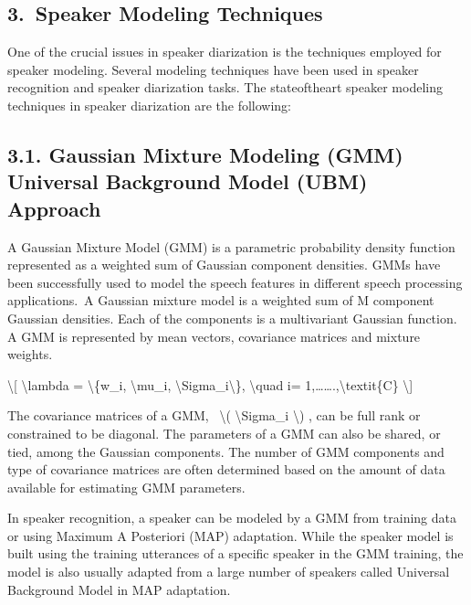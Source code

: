\documentclass[letterpaper,10pt,english]{jupyterBook}
\begin{document}
\subsection{3. Speaker Modeling Techniques}
\label{\detokenize{Recognition/Speaker_Recognition_and_Verification:speaker-modeling-techniques}}
\sphinxAtStartPar
One of the crucial issues in speaker diarization is the techniques
employed for speaker modeling. Several modeling techniques have been
used in speaker recognition and speaker diarization tasks. The
state\sphinxhyphen{}of\sphinxhyphen{}the\sphinxhyphen{}art speaker modeling techniques in speaker diarization are
the following:


\subsection{3.1. Gaussian Mixture Modeling (GMM) \sphinxhyphen{} Universal Background Model (UBM) Approach}
\label{\detokenize{Recognition/Speaker_Recognition_and_Verification:gaussian-mixture-modeling-gmm-universal-background-model-ubm-approach}}
\sphinxAtStartPar
A Gaussian Mixture Model (GMM) is a parametric probability density
function represented as a weighted sum of Gaussian component densities.
GMMs have been successfully used to model the speech features in
different speech processing applications. A Gaussian mixture model is a
weighted sum of M component Gaussian densities. Each of the components
is a multi\sphinxhyphen{}variant Gaussian function. A GMM is represented by mean
vectors, covariance matrices and mixture weights.

\sphinxAtStartPar
\textbackslash{}{[} \textbackslash{}lambda = \textbackslash{}\{w\_i, \textbackslash{}mu\_i, \textbackslash{}Sigma\_i\textbackslash{}\}, \textbackslash{}quad i=
1,…….,\textbackslash{}textit\{C\} \textbackslash{}{]}

\sphinxAtStartPar
The covariance matrices of a GMM,  \textbackslash{}( \textbackslash{}Sigma\_i \textbackslash{}) , can be full rank
or constrained to be diagonal. The parameters of a GMM can also be
shared, or tied, among the Gaussian components. The number of GMM
components and type of covariance matrices are often determined based on
the amount of data available for estimating GMM parameters.

\sphinxAtStartPar
In speaker recognition, a speaker can be modeled by a GMM from training
data or using Maximum A Posteriori (MAP) adaptation. While the speaker
model is built using the training utterances of a specific speaker in
the GMM training, the model is also usually adapted from a large number
of speakers called Universal Background Model in MAP adaptation.
\end{document}
